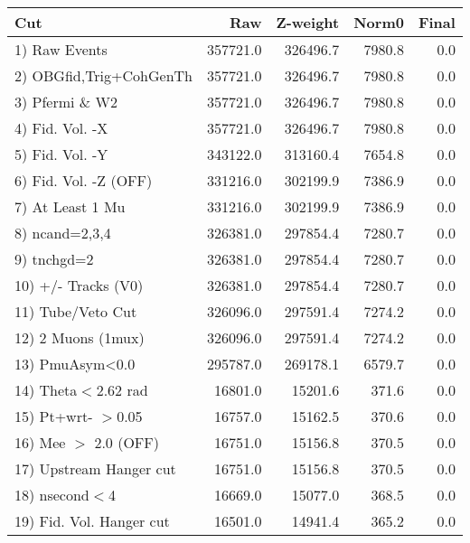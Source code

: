  \begin{table}[h!]\centering
 \begin{tabular}{||l||r|r|r|r||}
 \hline
 \hline
 Cut & Raw & Z-weight & Norm0 & Final \\
 \hline
  1) Raw Events           &    357721.0 &    326496.7 &      7980.8 &         0.0 \\
  2) OBGfid,Trig+CohGenTh &    357721.0 &    326496.7 &      7980.8 &         0.0 \\
  3) Pfermi \& W2         &    357721.0 &    326496.7 &      7980.8 &         0.0 \\
  4) Fid. Vol. -X         &    357721.0 &    326496.7 &      7980.8 &         0.0 \\
  5) Fid. Vol. -Y         &    343122.0 &    313160.4 &      7654.8 &         0.0 \\
  6) Fid. Vol. -Z (OFF)   &    331216.0 &    302199.9 &      7386.9 &         0.0 \\
  7) At Least 1 Mu        &    331216.0 &    302199.9 &      7386.9 &         0.0 \\
  8) ncand=2,3,4          &    326381.0 &    297854.4 &      7280.7 &         0.0 \\
  9) tnchgd=2             &    326381.0 &    297854.4 &      7280.7 &         0.0 \\
 10) +/- Tracks (V0)      &    326381.0 &    297854.4 &      7280.7 &         0.0 \\
 11) Tube/Veto Cut        &    326096.0 &    297591.4 &      7274.2 &         0.0 \\
 12) 2 Muons (1mux)       &    326096.0 &    297591.4 &      7274.2 &         0.0 \\
 13) PmuAsym<0.0          &    295787.0 &    269178.1 &      6579.7 &         0.0 \\
 14) Theta$<$2.62 rad     &     16801.0 &     15201.6 &       371.6 &         0.0 \\
 15) Pt+wrt- $>$0.05      &     16757.0 &     15162.5 &       370.6 &         0.0 \\
 16) Mee $>$ 2.0  (OFF)   &     16751.0 &     15156.8 &       370.5 &         0.0 \\
 17) Upstream Hanger cut  &     16751.0 &     15156.8 &       370.5 &         0.0 \\
 18) nsecond$<$4          &     16669.0 &     15077.0 &       368.5 &         0.0 \\
 19) Fid. Vol. Hanger cut &     16501.0 &     14941.4 &       365.2 &         0.0 \\

\end{tabular}
\end{table}
